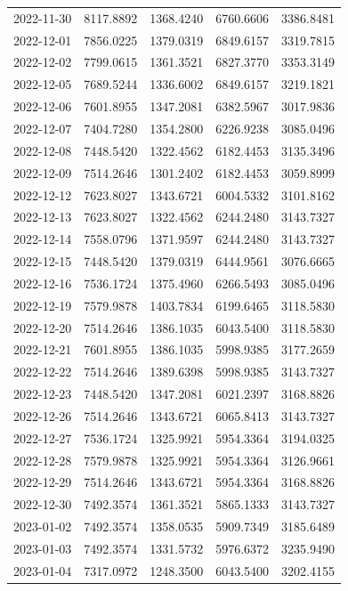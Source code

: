 \begin{footnotesize}
\begin{longtable}{lllll}
2022-11-30 & 8117.8892 & 1368.4240 & 6760.6606 & 3386.8481 \\
2022-12-01 & 7856.0225 & 1379.0319 & 6849.6157 & 3319.7815 \\
2022-12-02 & 7799.0615 & 1361.3521 & 6827.3770 & 3353.3149 \\
2022-12-05 & 7689.5244 & 1336.6002 & 6849.6157 & 3219.1821 \\
2022-12-06 & 7601.8955 & 1347.2081 & 6382.5967 & 3017.9836 \\
2022-12-07 & 7404.7280 & 1354.2800 & 6226.9238 & 3085.0496 \\
2022-12-08 & 7448.5420 & 1322.4562 & 6182.4453 & 3135.3496 \\
2022-12-09 & 7514.2646 & 1301.2402 & 6182.4453 & 3059.8999 \\
2022-12-12 & 7623.8027 & 1343.6721 & 6004.5332 & 3101.8162 \\
2022-12-13 & 7623.8027 & 1322.4562 & 6244.2480 & 3143.7327 \\
2022-12-14 & 7558.0796 & 1371.9597 & 6244.2480 & 3143.7327 \\
2022-12-15 & 7448.5420 & 1379.0319 & 6444.9561 & 3076.6665 \\
2022-12-16 & 7536.1724 & 1375.4960 & 6266.5493 & 3085.0496 \\
2022-12-19 & 7579.9878 & 1403.7834 & 6199.6465 & 3118.5830 \\
2022-12-20 & 7514.2646 & 1386.1035 & 6043.5400 & 3118.5830 \\
2022-12-21 & 7601.8955 & 1386.1035 & 5998.9385 & 3177.2659 \\
2022-12-22 & 7514.2646 & 1389.6398 & 5998.9385 & 3143.7327 \\
2022-12-23 & 7448.5420 & 1347.2081 & 6021.2397 & 3168.8826 \\
2022-12-26 & 7514.2646 & 1343.6721 & 6065.8413 & 3143.7327 \\
2022-12-27 & 7536.1724 & 1325.9921 & 5954.3364 & 3194.0325 \\
2022-12-28 & 7579.9878 & 1325.9921 & 5954.3364 & 3126.9661 \\
2022-12-29 & 7514.2646 & 1343.6721 & 5954.3364 & 3168.8826 \\
2022-12-30 & 7492.3574 & 1361.3521 & 5865.1333 & 3143.7327 \\
2023-01-02 & 7492.3574 & 1358.0535 & 5909.7349 & 3185.6489 \\
2023-01-03 & 7492.3574 & 1331.5732 & 5976.6372 & 3235.9490 \\
2023-01-04 & 7317.0972 & 1248.3500 & 6043.5400 & 3202.4155 \\

\end{longtable}
\end{footnotesize}

